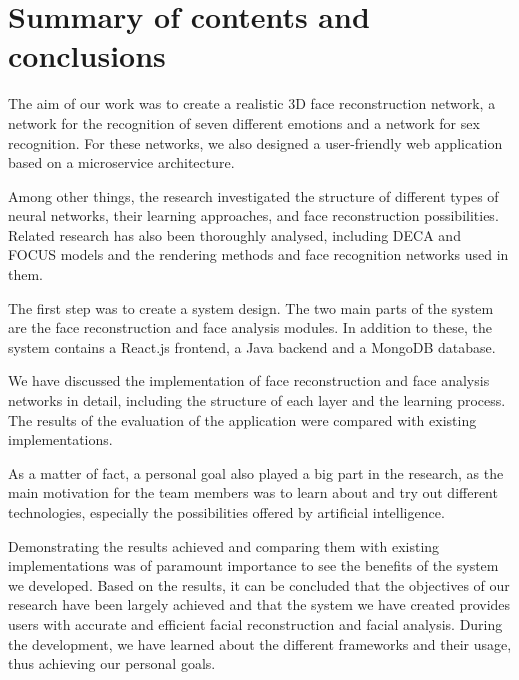 \documentclass[12pt,a4]{article}
\begin{document}
    \section{Summary of contents and conclusions}

        The aim of our work was to create a realistic 3D face reconstruction network, a network for the recognition of seven different emotions and a network for sex recognition. For these networks, we also designed a user-friendly web application based on a microservice architecture.
    
        Among other things, the research investigated the structure of different types of neural networks, their learning approaches, and face reconstruction possibilities. Related research has also been thoroughly analysed, including DECA and FOCUS models and the rendering methods and face recognition networks used in them.

        The first step was to create a system design. 
        The two main parts of the system are the face reconstruction and face analysis modules. In addition to these, the system contains a React.js frontend, a Java backend and a MongoDB database.

        We have discussed the implementation of face reconstruction and face analysis networks in detail, 
        including the structure of each layer and the learning process. The results of the evaluation of the application were compared with existing implementations.

        As a matter of fact, a personal goal also played a big part in the research, as the main motivation for the team members was to learn about and try out different technologies, especially the possibilities offered by artificial intelligence.

        Demonstrating the results achieved and comparing them with existing implementations was of paramount importance to see the benefits of the system we developed. Based on the results, it can be concluded that the objectives of our research have been largely achieved and that the system we have created provides users with accurate and efficient facial reconstruction and facial analysis. During the development, we have learned about the different frameworks and their usage, thus achieving our personal goals.
        
\end{document}
